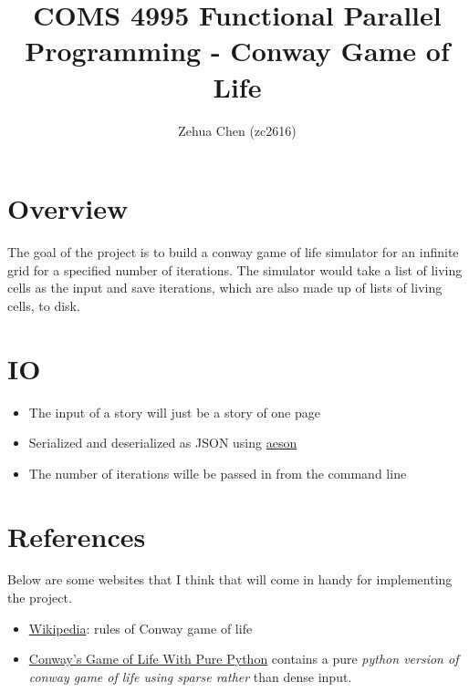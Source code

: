 \documentclass{article}
\title{COMS 4995 Functional Parallel Programming - Conway Game of Life}
\author{Zehua Chen (zc2616)}
\begin{document}
  \maketitle

  \section{Overview}

    The goal of the project is to build a conway game of life simulator for
    an infinite grid for a specified number of iterations. The simulator would
    take a list of living cells as the input and save iterations, which are
    also made up of lists of living cells, to disk.

  \section{IO}

    

    \begin{itemize}
      \item The input of a story will just be a story of one page
      \item Serialized and deserialized as JSON using
      \href{https://hackage.haskell.org/package/aeson}{aeson}
      \item The number of iterations wille be passed in from the command line
    \end{itemize}

  \section{References}

    Below are some websites that I think that will come in handy for implementing
    the project.

    \begin{itemize}
      \item \href{https://en.wikipedia.org/wiki/Conway%27s_Game_of_Life}{Wikipedia}:
      rules of Conway game of life
      \item \href{https://www.madelyneriksen.com/python-game-of-life}{Conway's Game of Life With Pure Python}
      contains a pure \emph{python version of conway game of life using sparse rather}
      than dense input.
    \end{itemize}
\end{document}
